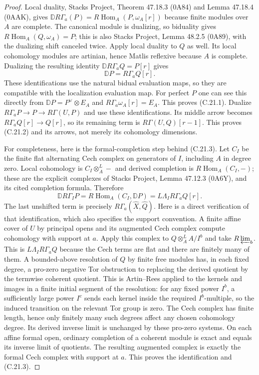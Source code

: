 \begin{proof}
Local duality, Stacks Project, Theorem 47.18.3 (0A84) and Lemma
47.18.4 (0AAK), gives
$\mathbb D R\Gamma_a(P)=R\operatorname{Hom}_A(P,\omega_A[r])$
because finite modules over $A$ are complete. The canonical
module is dualizing, so biduality gives
$R\operatorname{Hom}_A(Q,\omega_A)=P$; this is also
Stacks Project, Lemma 48.2.5 (0A89), with the dualizing
shift canceled twice. Apply local duality to $Q$ as well.
Its local cohomology modules are artinian, hence Matlis
reflexive because $A$ is complete. Dualizing the resulting
identity $\mathbb D R\Gamma_aQ=P[r]$ gives
\[
 \mathbb D P=R\Gamma_aQ[r].
\]
These identifications use the natural bidual evaluation maps,
so they are compatible with the localization evaluation map.
For perfect $P$ one can see this directly from
$\mathbb D P=P^\vee\otimes E_A$ and
$R\Gamma_a\omega_A[r]=E_A$.
This proves (C.21.1). Dualize
$R\Gamma_aP\to P\to R\Gamma(U,P)$ and use these
identifications. Its middle arrow becomes
$R\Gamma_aQ[r]\to Q[r]$, so its remaining term is
$R\Gamma(U,Q)[r-1]$. This proves (C.21.2) and its arrows,
not merely its cohomology dimensions.

For completeness, here is the formal-completion step behind
(C.21.3). Let $C_I$ be the finite flat alternating Cech complex
on generators of $I$, including $A$ in degree zero. Local
cohomology is $C_I\otimes_A^L-$ and derived completion is
$R\operatorname{Hom}_A(C_I,-)$; these are the explicit complexes
of Stacks Project, Lemma 47.12.3 (0A6Y), and its cited completion
formula. Therefore
\[
 \mathbb D R\Gamma_I P
 =R\operatorname{Hom}_A(C_I,\mathbb D P)
 =L\Lambda_I R\Gamma_a Q[r].
 \tag{C.21.7}
\]
The last unshifted term is precisely
$R\Gamma_a(\widehat X,\widehat Q)$.
Here is a direct verification of that identification, which also
specifies the support convention. A finite affine cover of
$U$ by principal opens and its augmented Cech complex compute
cohomology with support at $a$. Apply this complex to
$Q\otimes_A^L A/I^b$ and take $R\varprojlim_b$.
This is $L\Lambda_I R\Gamma_aQ$ because the Cech terms are flat
and there are finitely many of them. A bounded-above resolution of
$Q$ by finite free modules has, in each fixed degree, a pro-zero
negative Tor obstruction to replacing the derived quotient by the
termwise coherent quotient. This is Artin--Rees applied to the
kernels and images in a finite initial segment of the resolution:
for any fixed power $I^b$, a sufficiently large power $I^c$ sends
each kernel inside the required $I^b$-multiple, so the induced
transition on the relevant Tor group is zero. The Cech complex
has finite length, hence only finitely many such degrees affect
any chosen cohomology degree. Its derived inverse limit is
unchanged by these pro-zero systems. On each affine formal open,
ordinary completion of a coherent module is exact and equals
its inverse limit of quotients. The resulting augmented complex
is exactly the formal Cech complex with support at $a$.
This proves the identification and (C.21.3).


\end{proof}

